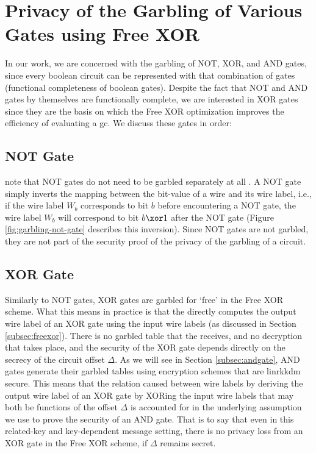 \section{Privacy of the Garbling of Various Gates using Free XOR}
\label{sec:sspANDgate}
In our work, we are concerned with the garbling of NOT, XOR, and AND gates, since every boolean circuit can be represented with that combination of gates (functional completeness of boolean gates). Despite the fact that NOT and AND gates by themselves are functionally complete, we are interested in XOR gates since they are the basis on which the Free XOR optimization improves the efficiency of evaluating a \acrlong{gc}. We discuss these gates in order:
\subsection{NOT Gate}
\label{subsec:notgate}

\citeauthor{ALP:KolSch08} note that NOT gates do not need to be garbled separately at all \cite[Section 3.1]{ALP:KolSch08}. A NOT gate simply inverts the mapping between the bit-value of a wire and its wire label, i.e., if the wire label $W_b$ corresponds to bit $b$ before encountering a NOT gate, the wire label $W_b$ will correspond to bit $b\xor 1$ after the NOT gate (Figure \ref{fig:garbling-not-gate} describes this inversion). 
Since NOT gates are not garbled, they are not part of the security proof of the privacy of the garbling of a circuit.

\subsection{XOR Gate}
\label{subsec:xorgate}
Similarly to NOT gates, XOR gates are garbled for `free' in the Free XOR scheme. What this means in practice is that the \cevaluator directly computes the output wire label of an XOR gate using the input wire labels (as discussed in Section \ref{subsec:freexor}). There is no garbled table that the \cevaluator receives, and no decryption that takes place, and the security of the XOR gate depends directly on the secrecy of the circuit offset $\Delta$. As we will see in Section \ref{subsec:andgate}, AND gates generate their garbled tables using encryption schemes that are \acrshort{linrkkdm} secure. This means that the relation caused between wire labels by deriving the output wire label of an XOR gate by XORing the input wire labels that may both be functions of the offset $\Delta$ is accounted for in the underlying assumption we use to prove the security of an AND gate. That is to say that even in this related-key and key-dependent message setting, there is no privacy loss from an XOR gate in the Free XOR scheme, if $\Delta$ remains secret.

